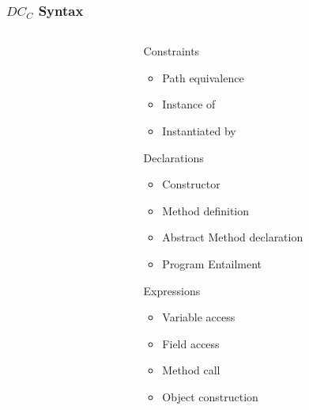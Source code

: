 \documentclass[leqno]{beamer}
\begin{document}
\begin{frame}
    \frametitle{$DC_C$ Syntax}
\begin{columns}
\begin{column}{0.1\textwidth}

\end{column}
\begin{column}{0.9\textwidth}
    \begin{itemize}
        \item[Constraints]
        \begin{itemize}
            \item Path equivalence
            \item Instance of
            \item Instantiated by
        \end{itemize}
        \item[Declarations]
        \begin{itemize}
            \item Constructor
            \item Method definition
            \item Abstract Method declaration
            \item Program Entailment
        \end{itemize}
        \item[Expressions]
        \begin{itemize}
            \item Variable access
            \item Field access
            \item Method call
            \item Object construction
        \end{itemize}
    \end{itemize}
\end{column}
\end{columns}
\end{frame}
\end{document}

